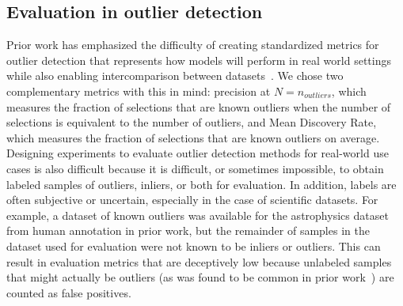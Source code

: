 \documentclass[utf8]{frontiersFPHY} %
\begin{document}
\subsection{Evaluation in outlier detection} 
Prior work has emphasized
the difficulty of creating standardized metrics for outlier detection that 
represents how models will perform in real world settings while also enabling
intercomparison between datasets~\cite{campos2016evaluation}. We chose two
complementary metrics with this in mind: precision at $N=n_{outliers}$, which
measures the fraction of selections that are known outliers when the number of
selections is equivalent to the number of outliers, and
Mean Discovery Rate, which measures the fraction of selections that are known 
outliers on average. 
Designing experiments to evaluate outlier detection methods for real-world
use cases is also difficult because it is difficult, or sometimes impossible, 
to obtain labeled samples of outliers, inliers, or both for evaluation. 
In addition, labels are often subjective or uncertain, 
especially in the case of scientific datasets. For example, a dataset of known
outliers was available for the astrophysics dataset from human annotation
in prior work, but the remainder of samples in the dataset used for evaluation
were not known to be inliers or outliers. This can result in evaluation metrics
that are deceptively low because unlabeled samples that might actually be
outliers (as was found to be common in prior work~\cite{wagstaff:des-anom20})
are counted as false positives. 

\end{document}
